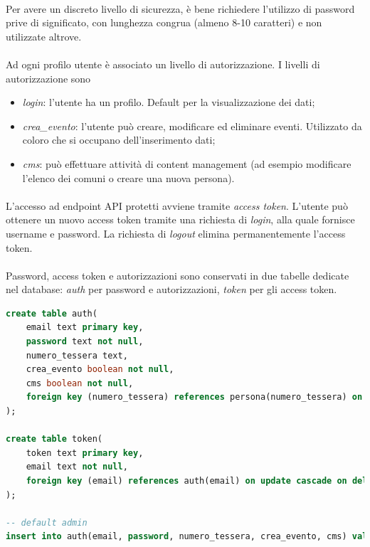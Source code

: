 \documentclass[12pt,a4paper,twoside,english,italian]{book}
\begin{document}
\paragraph{} Per avere un discreto livello di sicurezza, è bene richiedere l'utilizzo di password prive di significato, con lunghezza congrua (almeno 8-10 caratteri) e non utilizzate altrove. 

\paragraph{} Ad ogni profilo utente è associato un livello di autorizzazione. I livelli di autorizzazione sono\begin{itemize}
    \item \emph{login}: l'utente ha un profilo. Default per la visualizzazione dei dati;
    \item \emph{crea\_evento}: l'utente può creare, modificare ed eliminare eventi. Utilizzato da coloro che si occupano dell'inserimento dati; 
    \item \emph{cms}: può effettuare attività di content management (ad esempio modificare l'elenco dei comuni o creare una nuova persona). 
\end{itemize}

\paragraph{} L'accesso ad endpoint API protetti avviene tramite \emph{access token}. L'utente può ottenere un nuovo access token tramite una richiesta di \emph{login}, alla quale fornisce username e password. La richiesta di \emph{logout} elimina permanentemente l'access token. 

\paragraph{} Password, access token e autorizzazioni sono conservati in due tabelle dedicate nel database: \emph{auth} per password e autorizzazioni, \emph{token} per gli access token. 

\begin{lstlisting}[language=SQL, caption=tabelle auth e token]
create table auth(
    email text primary key,
    password text not null,
    numero_tessera text,
    crea_evento boolean not null,
    cms boolean not null,
    foreign key (numero_tessera) references persona(numero_tessera) on update cascade on delete cascade
);

create table token(
    token text primary key,
    email text not null,
    foreign key (email) references auth(email) on update cascade on delete cascade
);

-- default admin 
insert into auth(email, password, numero_tessera, crea_evento, cms) values ('admin', 'admin', null, True, True);
\end{lstlisting}
\end{document}

